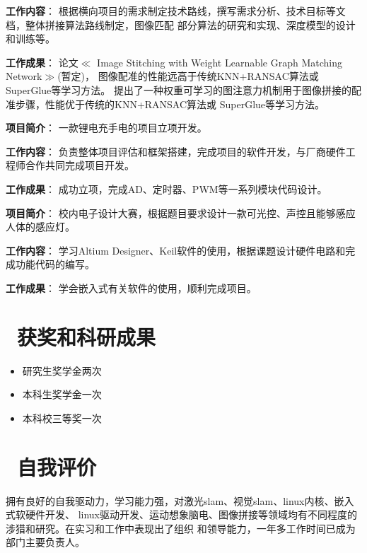 \documentclass{resume}
\begin{document}
\textcolor[RGB]{80,100,190}{\textbf{工作内容}}：
根据横向项目的需求制定技术路线，撰写需求分析、技术目标等文档，整体拼接算法路线制定，图像匹配
部分算法的研究和实现、深度模型的设计和训练等。

\textcolor[RGB]{80,100,190}{\textbf{工作成果}}：
论文$\ll$ Image Stitching with Weight Learnable Graph Matching Network$\gg$(暂定)，
图像配准的性能远高于传统KNN+RANSAC算法或SuperGlue等学习方法。
提出了一种权重可学习的图注意力机制用于图像拼接的配准步骤，性能优于传统的KNN+RANSAC算法或
SuperGlue等学习方法。

\textcolor[RGB]{80,100,190}{\textbf{项目简介}}：
一款锂电充手电的项目立项开发。

\textcolor[RGB]{80,100,190}{\textbf{工作内容}}：
负责整体项目评估和框架搭建，完成项目的软件开发，与厂商硬件工程师合作共同完成项目开发。

\textcolor[RGB]{80,100,190}{\textbf{工作成果}}：
成功立项，完成AD、定时器、PWM等一系列模块代码设计。


\textcolor[RGB]{80,100,190}{\textbf{项目简介}}：
校内电子设计大赛，根据题目要求设计一款可光控、声控且能够感应人体的感应灯。

\textcolor[RGB]{80,100,190}{\textbf{工作内容}}：
学习Altium Designer、Keil软件的使用，根据课题设计硬件电路和完成功能代码的编写。

\textcolor[RGB]{80,100,190}{\textbf{工作成果}}：
学会嵌入式有关软件的使用，顺利完成项目。


\section{\textcolor[RGB]{50,50,190}{\faPaperPlane\ 获奖和科研成果}}
\begin{itemize}
  \item 研究生奖学金两次
  \item 本科生奖学金一次
  \item 本科校三等奖一次
\end{itemize}

\section{\textcolor[RGB]{50,50,190}{\faChild\ 自我评价}}
拥有良好的自我驱动力，学习能力强，对激光slam、视觉slam、linux内核、嵌入式软硬件开发、
linux驱动开发、运动想象脑电、图像拼接等领域均有不同程度的涉猎和研究。在实习和工作中表现出了组织
和领导能力，一年多工作时间已成为部门主要负责人。



%
%
\end{document}
